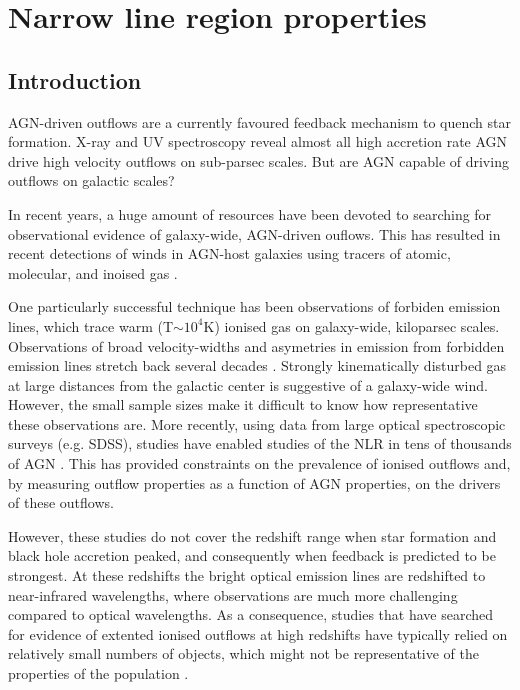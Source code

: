 
\chapter{Narrow line region properties}
\label{ch:nlr} 

\section{Introduction}

AGN-driven outflows are a currently favoured feedback mechanism to quench star formation. 
X-ray and UV spectroscopy reveal almost all high accretion rate AGN drive high velocity outflows on sub-parsec scales. 
But are AGN capable of driving outflows on galactic scales?

In recent years, a huge amount of resources have been devoted to searching for observational evidence of galaxy-wide, AGN-driven ouflows. 
This has resulted in recent detections of winds in AGN-host galaxies using tracers of atomic, molecular, and inoised gas \citep[e.g.][]{nesvadba06,arav08,nesvadba08,moe09,dunn10,alexander10,harrison12,harrison14,nesvadba10,rupke13,veilleux13,nardini15,feruglio10,alatalo11,cimatti13,cicone14}.  

One particularly successful technique has been observations of forbiden emission lines, which trace warm (T$\sim10^4$K) ionised gas on galaxy-wide, kiloparsec scales.
Observations of broad velocity-widths and asymetries in emission from forbidden emission lines stretch back several decades \citep[e.g.][]{weedman70,stockton76,heckman81,veron81,feldman82,heckman84,vrtilek85,whittle85,boroson92}. 
Strongly kinematically disturbed gas at large distances from the galactic center is suggestive of a galaxy-wide wind. 
However, the small sample sizes make it difficult to know how representative these observations are. 
More recently, using data from large optical spectroscopic surveys (e.g. SDSS), studies have enabled studies of the NLR in tens of thousands of AGN \citep[e.g.][]{boroson05,greene05a,zhang11,mullaney13,zakamska14,shen14}. 
This has provided constraints on the prevalence of ionised outflows and, by measuring outflow properties as a function of AGN properties, on the drivers of these outflows.  

However, these studies do not cover the redshift range when star formation and black hole accretion peaked, and consequently when feedback is predicted to be strongest. 
At these redshifts the bright optical emission lines are redshifted to near-infrared wavelengths, where observations are much more challenging compared to optical wavelengths. 
As a consequence, studies that have searched for evidence of extented ionised outflows at high redshifts have typically relied on relatively small numbers of objects, which might not be representative of the properties of the population \citep[e.g.][]{nesvadba06,nesvadba08,alexander10,cano-diaz12,harrison12,forster-schreiber14,brusa15,carniani15,cresci15}.

